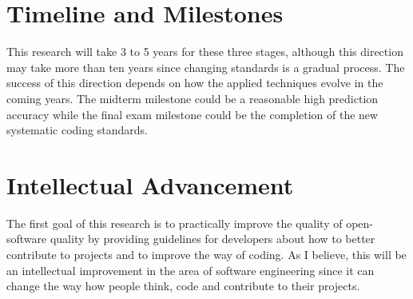 \documentclass[10pt,conference]{IEEEtran}
\begin{document}
\section{Timeline and Milestones}

This research will take 3 to 5 years for these three stages, although this direction may take more than ten years since changing standards is a gradual process. The success of this direction depends on how the applied techniques evolve in the coming years. The midterm milestone could be a reasonable high prediction accuracy while the final exam milestone could be the completion of the new systematic coding standards.

\section{Intellectual Advancement}

The first goal of this research is to practically improve the quality of open-software quality by providing guidelines for developers about how to better contribute to projects and to improve the way of coding. 
As I believe, this will be an intellectual improvement in the area of software engineering since it can change the way how people think, code and contribute to their projects.

\medskip
%
%

\vspace{12pt}
\color{red}
\end{document}
